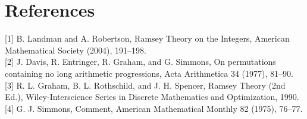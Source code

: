 \documentclass[10pt]{article}
\begin{document}
\newpage\section*{References}
\small
[1] B. Landman and A. Robertson, Ramsey Theory on the Integers, American Mathematical Society (2004), 191--198.\\[0pt]
[2] J. Davis, R. Entringer, R. Graham, and G. Simmons, On permutations containing no long arithmetic progressions, Acta Arithmetica 34 (1977), 81--90.\\[0pt]
[3] R. L. Graham, B. L. Rothschild, and J. H. Spencer, Ramsey Theory (2nd Ed.), Wiley-Interscience Series in Discrete Mathematics and Optimization, 1990.\\[0pt]
[4] G. J. Simmons, Comment, American Mathematical Monthly 82 (1975), 76--77.
\end{document}

